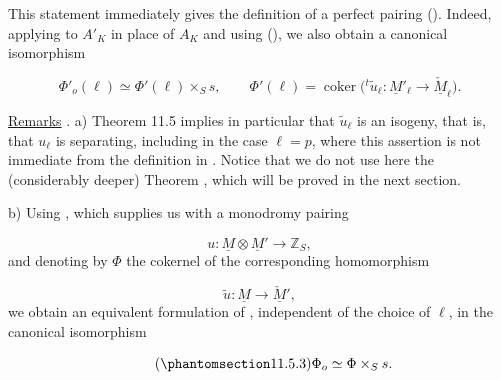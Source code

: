 This statement immediately gives the definition of a perfect pairing
(). Indeed, applying  to $A'_K$ in place of $A_K$ and using
(), we also obtain a canonical isomorphism

\begin{equation*}
\Phi'_o(\ell)\simeq\Phi'(\ell)\times_S s,
\qquad
\Phi'(\ell)=\operatorname{coker}\bigl(
 {}^t\!\widetilde u_\ell:\underline M'_\ell
 \longrightarrow\underline{\check M}_\ell\bigr).
\end{equation*}

\medskip
\noindent
\underline{Remarks} . a) Theorem 11.5 implies in particular that
$\widetilde u_\ell$ is an isogeny, that is, that $u_\ell$ is
separating, including in the case $\ell=p$, where this assertion is not
immediate from the definition in . Notice that we do not use here
the (considerably deeper) Theorem , which will be proved in the next
section.

\smallskip
\noindent
b) Using , which supplies us with a monodromy pairing

\begin{equation*}
u:\underline M\otimes\underline M'\longrightarrow\mathbb Z_S,
\end{equation*}
and denoting by $\Phi$ the cokernel of the corresponding homomorphism

\begin{equation*}
\widetilde u:\underline M\longrightarrow\underline{\check M}',
\end{equation*}
we obtain an equivalent formulation of , independent of the choice
of $\ell$, in the canonical isomorphism

\begin{equation}\tag{\SGARefTarget{sga7.sga7i.eix.n11-5-3}{11.5.3}}
\Phi_o\simeq\Phi\times_S s.
\end{equation}
